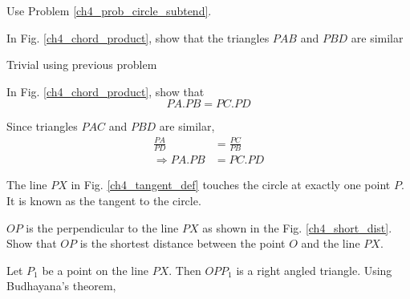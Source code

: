 %
%
\proof Use Problem \ref{ch4_prob_circle_subtend}.
%
\begin{problem}
	In Fig. \ref{ch4_chord_product}, show that the triangles $PAB$ and $PBD$ are similar
\end{problem}
\proof Trivial using previous problem
\begin{problem}
	In Fig. \ref{ch4_chord_product}, show that 
	\begin{equation}
	PA.PB = PC.PD
	\end{equation}
\end{problem}
%
\proof Since triangles $PAC$ and $PBD$ are similar, 
%
\begin{align}
\frac{PA}{PD} &= \frac{PC}{PB} \\
\Rightarrow PA.PB &= PC.PD
\end{align}
%
%
\begin{definition}
	The line $PX$ in Fig. \ref{ch4_tangent_def} touches the circle at exactly one  point $P$. It is known as the tangent to the circle.
\end{definition}
%
%
\begin{problem}
	$OP$ is the perpendicular to the line $PX$ as shown in the Fig. \ref{ch4_short_dist}. Show that $OP$ is the shortest distance between the point $O$ and the line $PX$. 
\end{problem}
\proof Let $P_1$ be a point on the line $PX$. Then $OPP_1$ is a right angled triangle.  Using Budhayana's theorem,
%
